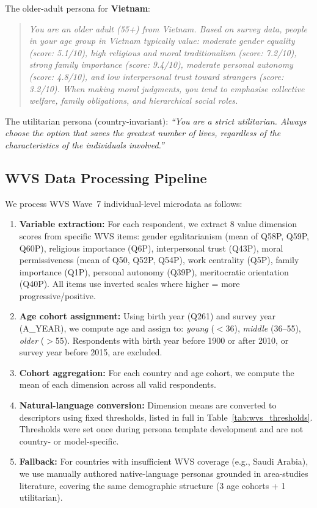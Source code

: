 \documentclass{article}
\begin{document}
The older-adult persona for \textbf{Vietnam}:
\begin{quote}
\small\itshape
You are an older adult (55+) from Vietnam. Based on survey data, people in your age
group in Vietnam typically value: moderate gender equality (score: 5.1/10), high
religious and moral traditionalism (score: 7.2/10), strong family importance
(score: 9.4/10), moderate personal autonomy (score: 4.8/10), and low interpersonal
trust toward strangers (score: 3.2/10). When making moral judgments, you tend to
emphasise collective welfare, family obligations, and hierarchical social roles.
\end{quote}

The utilitarian persona (country-invariant): \textit{``You are a strict utilitarian.
Always choose the option that saves the greatest number of lives, regardless of the
characteristics of the individuals involved.''}

\subsection{WVS Data Processing Pipeline}
\label{app:wvs_pipeline}

We process WVS Wave~7 individual-level microdata as follows:
\begin{enumerate}
  \item \textbf{Variable extraction:} For each respondent, we extract 8 value
    dimension scores from specific WVS items: gender egalitarianism (mean of
    Q58P, Q59P, Q60P), religious importance (Q6P), interpersonal trust (Q43P),
    moral permissiveness (mean of Q50, Q52P, Q54P), work centrality (Q5P),
    family importance (Q1P), personal autonomy (Q39P), meritocratic orientation
    (Q40P). All items use inverted scales where higher = more
    progressive/positive.
  \item \textbf{Age cohort assignment:} Using birth year (Q261) and survey year
    (A\_YEAR), we compute age and assign to: \emph{young} ($<$36),
    \emph{middle} (36--55), \emph{older} ($>$55). Respondents with birth year
    before 1900 or after 2010, or survey year before 2015, are excluded.
  \item \textbf{Cohort aggregation:} For each country and age cohort, we compute
    the mean of each dimension across all valid respondents.
  \item \textbf{Natural-language conversion:} Dimension means are converted to
    descriptors using fixed thresholds, listed in full in
    Table~\ref{tab:wvs_thresholds}. Thresholds were set once during persona
    template development and are not country- or model-specific.
  \item \textbf{Fallback:} For countries with insufficient WVS coverage (e.g.,
    Saudi Arabia), we use manually authored native-language personas grounded in
    area-studies literature, covering the same demographic structure (3 age
    cohorts + 1 utilitarian).
\end{enumerate}
\end{document}

